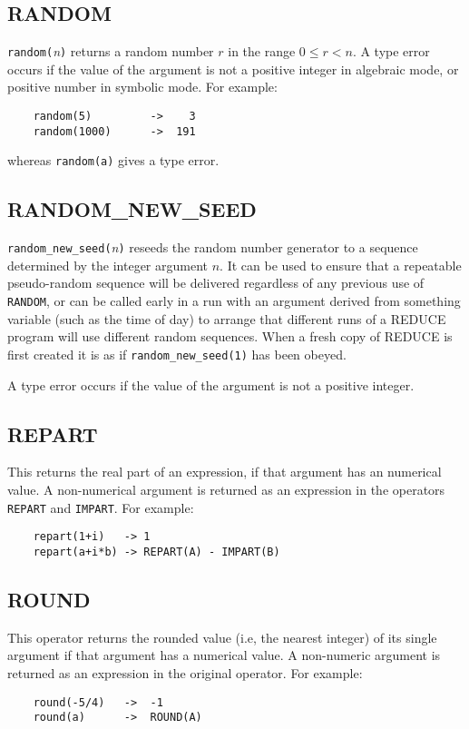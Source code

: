 \subsection{RANDOM}
\hypertarget{operator:RANDOM}{}

{\tt random(}{\em n\/}{\tt)} returns a random number $r$ in the range $0
\leq r < n$.  A type error occurs if the value of the argument is not a
positive integer in algebraic mode, or positive number in symbolic mode.
For example:
\begin{verbatim}
	random(5)         ->    3
	random(1000)      ->  191
\end{verbatim}
whereas {\tt random(a)} gives a type error.

\subsection{RANDOM\_NEW\_SEED}
\hypertarget{operator:RANDOM_NEW_SEED}{}

{\tt random\_new\_seed(}{\em n\/}{\tt)} reseeds the random number generator
to a sequence determined by the integer argument $n$.  It can be used to
ensure that a repeatable pseudo-random sequence will be delivered
regardless of any previous use of {\tt RANDOM}, or can be called early in
a run with an argument derived from something variable (such as the time
of day) to arrange that different runs of a REDUCE program will use
different random sequences.  When a fresh copy of REDUCE is first created
it is as if {\tt random\_new\_seed(1)} has been obeyed.

A type error occurs if the value of the argument is not a positive integer.

\subsection{REPART}
\hypertarget{operator:REPART}{}
This returns the real part of an expression, if that argument has an
numerical value.  A non-numerical argument is returned as an expression in
the operators {\tt REPART} and {\tt IMPART}.  For example:
\begin{verbatim}
	repart(1+i)   -> 1
	repart(a+i*b) -> REPART(A) - IMPART(B)
\end{verbatim}

\subsection{ROUND}
\hypertarget{operator:ROUND}{}
This operator returns the rounded value (i.e, the nearest integer) of its
single argument if that argument has a numerical value.  A non-numeric
argument is returned as an expression in the original operator.  For
example:
\begin{verbatim}
	round(-5/4)   ->  -1
	round(a)      ->  ROUND(A)
\end{verbatim}


